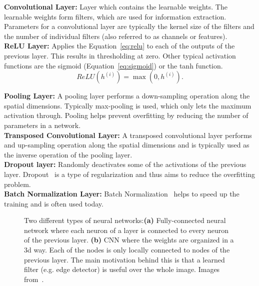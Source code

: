 \textbf{Convolutional Layer:} Layer which contains the learnable weights. The learnable weights form filters, which are used for information extraction. Parameters for a convolutional layer are typically the kernel size of the filters and the number of individual filters (also referred to as channels or features).\\

\textbf{ReLU Layer:} Applies the Equation~\ref{eq:relu} to each of the outputs of the previous layer. This results in thresholding at zero. Other typical activation functions are the sigmoid (Equation~\ref{eq:sigmoid}) or the tanh function.\\
\begin{equation}
   ReLU({h}^{(i)}) = \max(0, {h}^{(i)}).
   \label{eq:relu}
\end{equation}

\textbf{Pooling Layer:} A pooling layer performs a down-sampling operation along the spatial dimensions. Typically max-pooling is used, which only lets the maximum activation through. Pooling helps prevent overfitting by reducing the number of parameters in a network.\\

\textbf{Transposed Convolutional Layer:} A transposed convolutional layer performs and up-sampling operation along the spatial dimensions and is typically used as the inverse operation of the pooling layer.\\

\textbf{Dropout layer:} Randomly deactivates some of the activations of the previous layer. Dropout~\cite{Srivastava2014Dropout:Overfitting} is a type of regularization and thus aims to reduce the overfitting problem.\\

\textbf{Batch Normalization Layer:} Batch Normalization~\cite{SergeyIoffe2015BatchNormalization} helps to speed up the training and is often used today.
 
\begin{figure}[htbp]
	\centering
	\hfill
	\caption[Regular Neural Networks and Convolutional Neural Networks]{Two different types of neural networks:\textbf{(a)} Fully-connected neural network where each neuron of a layer is connected to every neuron of the previous layer. \textbf{(b)} CNN where the weights are organized in a \gls{3d} way. Each of the nodes is only locally connected to nodes of the previous layer. The main motivation behind this is that a learned filter (e.g. edge detector) is useful over the whole image. Images from~\cite{KarpathyStanfordRecognition}.}
	\label{fig:mlearn_nn_cnn}  
\end{figure}


